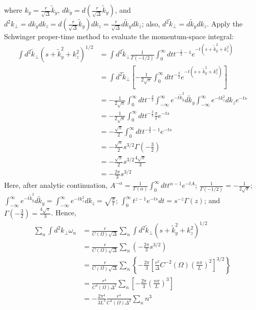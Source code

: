 \documentclass[english]{article}
\begin{document}
 where $k_{y}=\frac{r}{\sqrt{\Delta}}\tilde{k}_{y}$, $dk_{y}=d\left(\frac{r}{\sqrt{\Delta}}\tilde{k}_{y}\right)$,
and $d^{2}k_{\perp}=dk_{y}dk_{z}=d\left(\frac{r}{\sqrt{\Delta}}\tilde{k}_{y}\right)dk_{z}=\frac{r}{\sqrt{\Delta}}d\tilde{k}_{y}dk_{z}$;
also, $d^{2}\tilde{k}_{\perp}=d\tilde{k}_{y}dk_{z}$. Apply the Schwinger
proper-time method to evaluate the momentum-space integral: 
\begin{align*}
\int d^{2}\tilde{k}_{\perp}\left(s+\tilde{k}^{2}_{y}+k^{2}_{z}\right)^{1/2} & =\int d^{2}\tilde{k}_{\perp}\frac{1}{\Gamma\left(-1/2\right)}\int^{\infty}_{0}dtt^{-\frac{1}{2}-1}e^{-t\left(s+\tilde{k}^{2}_{y}+k^{2}_{z}\right)}\\
 & =\int d^{2}\tilde{k}_{\perp}\left[-\frac{1}{2\sqrt{\pi}}\int^{\infty}_{0}dtt^{-\frac{3}{2}}e^{-t\left(s+\tilde{k}^{2}_{y}+k^{2}_{z}\right)}\right]\\
 & =-\frac{1}{2\sqrt{\pi}}\int^{\infty}_{0}dtt^{-\frac{3}{2}}\int^{\infty}_{-\infty}e^{-t\tilde{k}^{2}_{y}}d\tilde{k}_{y}\int^{\infty}_{-\infty}e^{-tk^{2}_{z}}dk_{z}e^{-ts}\\
 & =-\frac{1}{2\sqrt{\pi}}\int^{\infty}_{0}dtt^{-\frac{3}{2}}\frac{\pi}{t}e^{-ts}\\
 & =-\frac{\sqrt{\pi}}{2}\int^{\infty}_{0}dtt^{-\frac{3}{2}-1}e^{-ts}\\
 & =-\frac{\sqrt{\pi}}{2}s^{3/2}\Gamma\left(-\frac{3}{2}\right)\\
 & =-\frac{\sqrt{\pi}}{2}s^{3/2}\frac{4\sqrt{\pi}}{3}\\
 & =-\frac{2\pi}{3}s^{3/2}
\end{align*}
 Here, after analytic continuation, $A^{-\alpha}=\frac{1}{\Gamma\left(\alpha\right)}\int^{\infty}_{0}dtt^{\alpha-1}e^{-tA}$;
$\frac{1}{\Gamma\left(-1/2\right)}=-\frac{1}{2\sqrt{\pi}}$; $\int^{\infty}_{-\infty}e^{-t\tilde{k}^{2}_{y}}d\tilde{k}_{y}=\int^{\infty}_{-\infty}e^{-tk^{2}_{z}}dk_{z}=\sqrt{\frac{\pi}{t}}$;
$\int^{\infty}_{0}t^{z-1}e^{-ts}dt=s^{-z}\Gamma\left(z\right)$; and
$\Gamma\left(-\frac{3}{2}\right)=\frac{4\sqrt{\pi}}{3}$. Hence, 
\begin{align*}
\sum_{n}\int d^{2}k_{\perp}\omega_{n} & =\frac{r}{C\left(\Omega\right)\sqrt{\Delta}}\sum_{n}\int d^{2}\tilde{k}_{\perp}\left(s+\tilde{k}^{2}_{y}+k^{2}_{z}\right)^{1/2}\\
 & =\frac{r}{C\left(\Omega\right)\sqrt{\Delta}}\sum_{n}\left(-\frac{2\pi}{3}s^{3/2}\right)\\
 & =\frac{r}{C\left(\Omega\right)\sqrt{\Delta}}\sum_{n}\left\{ -\frac{2\pi}{3}\left[\frac{r^{2}}{\Delta}C^{-2}\left(\Omega\right)\left(\frac{n\pi}{L}\right)^{2}\right]^{3/2}\right\} \\
 & =\frac{r^{4}}{C^{4}\left(\Omega\right)\Delta^{2}}\sum_{n}\left[-\frac{2\pi}{3}\left(\frac{n\pi}{L}\right)^{3}\right]\\
 & =-\frac{2\pi^{4}}{3L^{3}}\frac{r^{4}}{C^{4}\left(\Omega\right)\Delta^{2}}\sum_{n}n^{3}
\end{align*}
\end{document}
